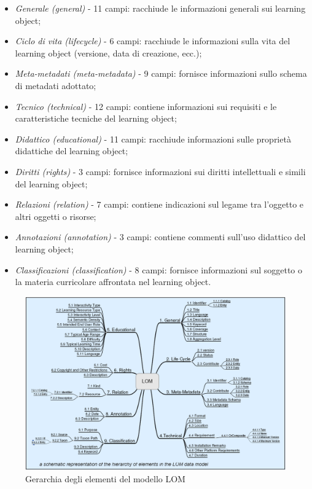 \begin{itemize}
\item \textit{Generale (general)} - 11 campi: racchiude le informazioni generali sui learning object;
\item \textit{Ciclo di vita (lifecycle)} - 6 campi: racchiude le informazioni sulla vita del learning object (versione, data di creazione, ecc.);
\item \textit{Meta-metadati (meta-metadata)} - 9 campi: fornisce informazioni sullo schema di metadati adottato;
\item \textit{Tecnico (technical)} - 12 campi: contiene informazioni sui requisiti e le caratteristiche tecniche del learning object;
\item \textit{Didattico (educational)} - 11 campi: racchiude informazioni sulle proprietà didattiche del learning object;
\item \textit{Diritti (rights)} - 3 campi: fornisce informazioni sui diritti intellettuali e simili del learning object;
\item \textit{Relazioni (relation)} - 7 campi: contiene indicazioni sul legame tra l'oggetto e altri oggetti o risorse;
\item \textit{Annotazioni (annotation)} - 3 campi: contiene commenti sull'uso didattico del learning object;
\item \textit{Classificazioni (classification)} - 8 campi: fornisce informazioni sul soggetto o la materia curricolare affrontata nel learning object.
\end{itemize}

\begin{figure}[H]
\centering
\includegraphics[scale=0.3]{res/LOM.png}
\caption{Gerarchia degli elementi del modello LOM}
\label{fig:lom}
\end{figure}

